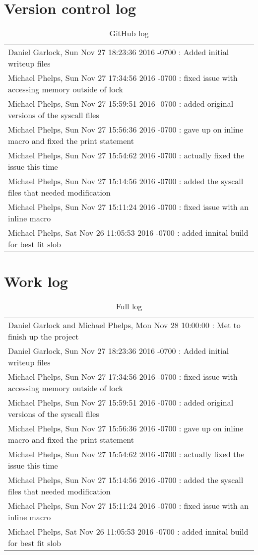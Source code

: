 \documentclass[letterpaper,10pt,titlepage,onecolumn,draftclsnofoot]{IEEETran}
\begin{document}
\newpage
\section{Version control log}
\begin{table}[H]
  \small
\caption{GitHub log}

\begin{tabular}{l}
\hline
Daniel Garlock, Sun Nov 27 18:23:36 2016 -0700 : Added initial writeup files\\
Michael Phelps, Sun Nov 27 17:34:56 2016 -0700 : fixed issue with accessing memory outside of lock\\
Michael Phelps, Sun Nov 27 15:59:51 2016 -0700 : added original versions of the syscall files\\
Michael Phelps, Sun Nov 27 15:56:36 2016 -0700 : gave up on inline macro and fixed the print statement\\
Michael Phelps, Sun Nov 27 15:54:62 2016 -0700 : actually fixed the issue this time\\
Michael Phelps, Sun Nov 27 15:14:56 2016 -0700 : added the syscall files that needed modification\\
Michael Phelps, Sun Nov 27 15:11:24 2016 -0700 : fixed issue with an inline macro\\
Michael Phelps, Sat Nov 26 11:05:53 2016 -0700 : added innital build for best fit slob\\
\hline
\end{tabular}
\end{table}

\section{Work log}

\begin{table}[H]
  \small
\caption{Full log}

\begin{tabular}{l}
\hline
Daniel Garlock and Michael Phelps, Mon Nov 28 10:00:00 : Met to finish up the project\\
Daniel Garlock, Sun Nov 27 18:23:36 2016 -0700 : Added initial writeup files\\
Michael Phelps, Sun Nov 27 17:34:56 2016 -0700 : fixed issue with accessing memory outside of lock\\
Michael Phelps, Sun Nov 27 15:59:51 2016 -0700 : added original versions of the syscall files\\
Michael Phelps, Sun Nov 27 15:56:36 2016 -0700 : gave up on inline macro and fixed the print statement\\
Michael Phelps, Sun Nov 27 15:54:62 2016 -0700 : actually fixed the issue this time\\
Michael Phelps, Sun Nov 27 15:14:56 2016 -0700 : added the syscall files that needed modification\\
Michael Phelps, Sun Nov 27 15:11:24 2016 -0700 : fixed issue with an inline macro\\
Michael Phelps, Sat Nov 26 11:05:53 2016 -0700 : added innital build for best fit slob\\
\hline
\end{tabular}
\end{table}
\end{document}
